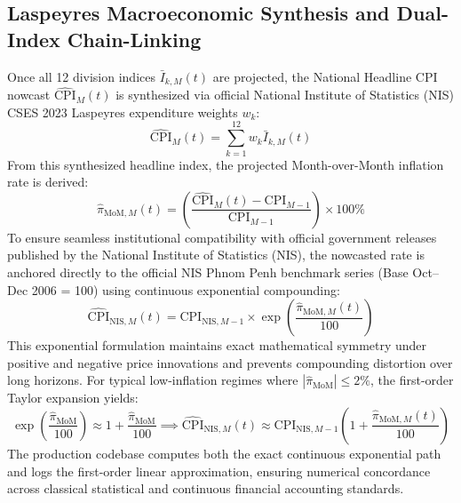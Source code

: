 \subsection{Laspeyres Macroeconomic Synthesis and Dual-Index Chain-Linking}
\hs Once all 12 division indices $\bar{I}_{k, M}(t)$ are projected, the National Headline CPI nowcast $\widehat{\text{CPI}}_M(t)$ is synthesized via official National Institute of Statistics (NIS) CSES 2023 Laspeyres expenditure weights $w_k$:
\begin{equation}
    \widehat{\text{CPI}}_M(t) = \sum_{k=1}^{12} w_k \bar{I}_{k, M}(t)
\end{equation}
From this synthesized headline index, the projected Month-over-Month inflation rate is derived:
\begin{equation}
    \widehat{\pi}_{\text{MoM}, M}(t) = \left( \frac{\widehat{\text{CPI}}_M(t) - \text{CPI}_{M-1}}{\text{CPI}_{M-1}} \right) \times 100\%
\end{equation}
\hs To ensure seamless institutional compatibility with official government releases published by the National Institute of Statistics (NIS), the nowcasted rate is anchored directly to the official NIS Phnom Penh benchmark series (Base Oct--Dec 2006 = 100) using continuous exponential compounding:
\begin{equation}
    \widehat{\text{CPI}}_{\text{NIS}, M}(t) = \text{CPI}_{\text{NIS}, M-1} \times \exp\left( \frac{\widehat{\pi}_{\text{MoM}, M}(t)}{100} \right)
\end{equation}
This exponential formulation maintains exact mathematical symmetry under positive and negative price innovations and prevents compounding distortion over long horizons. For typical low-inflation regimes where $|\widehat{\pi}_{\text{MoM}}| \le 2\%$, the first-order Taylor expansion yields:
\begin{equation}
    \exp\left( \frac{\widehat{\pi}_{\text{MoM}}}{100} \right) \approx 1 + \frac{\widehat{\pi}_{\text{MoM}}}{100} \implies \widehat{\text{CPI}}_{\text{NIS}, M}(t) \approx \text{CPI}_{\text{NIS}, M-1} \left( 1 + \frac{\widehat{\pi}_{\text{MoM}, M}(t)}{100} \right)
\end{equation}
The production codebase computes both the exact continuous exponential path and logs the first-order linear approximation, ensuring numerical concordance across classical statistical and continuous financial accounting standards.

